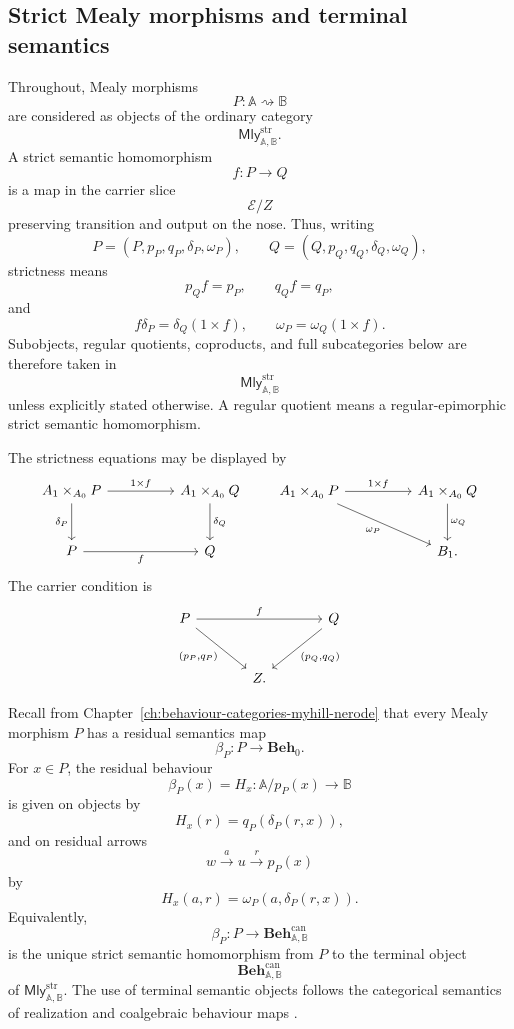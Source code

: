 \subsection{Strict Mealy morphisms and terminal semantics}
\label{subsec:coeq-standing-notation-terminal-semantics}

Throughout, Mealy morphisms
\[
    P:\mathbb A\rightsquigarrow\mathbb B
\]
are considered as objects of the ordinary category
\[
    \mathsf{Mly}^{\mathrm{str}}_{\mathbb A,\mathbb B}.
\]
A strict semantic homomorphism
\[
    f:P\to Q
\]
is a map in the carrier slice
\[
    \mathcal E/Z
\]
preserving transition and output on the nose. Thus, writing
\[
    P=(P,p_P,q_P,\delta_P,\omega_P),
    \qquad
    Q=(Q,p_Q,q_Q,\delta_Q,\omega_Q),
\]
strictness means
\[
    p_Qf=p_P,
    \qquad
    q_Qf=q_P,
\]
and
\[
    f\delta_P
    =
    \delta_Q(1\times f),
    \qquad
    \omega_P
    =
    \omega_Q(1\times f).
\]
Subobjects, regular quotients, coproducts, and full subcategories below are
therefore taken in
\[
    \mathsf{Mly}^{\mathrm{str}}_{\mathbb A,\mathbb B}
\]
unless explicitly stated otherwise. A regular quotient means a
regular-epimorphic strict semantic homomorphism.

The strictness equations may be displayed by
\[
\begin{tikzcd}[column sep=huge, row sep=large]
    A_1\times_{A_0}P
        \arrow[r, "{1\times f}"]
        \arrow[d, "\delta_P"']
    &
    A_1\times_{A_0}Q
        \arrow[d, "\delta_Q"]
    \\
    P
        \arrow[r, "f"']
    &
    Q
\end{tikzcd}
\qquad
\begin{tikzcd}[column sep=huge, row sep=large]
    A_1\times_{A_0}P
        \arrow[r, "{1\times f}"]
        \arrow[dr, "\omega_P"']
    &
    A_1\times_{A_0}Q
        \arrow[d, "\omega_Q"]
    \\
    &
    B_1 .
\end{tikzcd}
\]
The carrier condition is
\[
\begin{tikzcd}[column sep=large, row sep=large]
    P
        \arrow[rr, "f"]
        \arrow[dr, "{(p_P,q_P)}"']
    &&
    Q
        \arrow[dl, "{(p_Q,q_Q)}"]
    \\
    &
    Z .
\end{tikzcd}
\]

Recall from Chapter~\ref{ch:behaviour-categories-myhill-nerode} that every
Mealy morphism \(P\) has a residual semantics map
\[
    \beta_P:P\to\mathbf{Beh}_0.
\]
For \(x\in P\), the residual behaviour
\[
    \beta_P(x)=H_x:\mathbb A/p_P(x)\to\mathbb B
\]
is given on objects by
\[
    H_x(r)=q_P(\delta_P(r,x)),
\]
and on residual arrows
\[
    w\xrightarrow{a}u\xrightarrow{r}p_P(x)
\]
by
\[
    H_x(a,r)=\omega_P(a,\delta_P(r,x)).
\]
Equivalently,
\[
    \beta_P:P\to\mathbf{Beh}^{\mathrm{can}}_{\mathbb A,\mathbb B}
\]
is the unique strict semantic homomorphism from \(P\) to the terminal object
\[
    \mathbf{Beh}^{\mathrm{can}}_{\mathbb A,\mathbb B}
\]
of \(\mathsf{Mly}^{\mathrm{str}}_{\mathbb A,\mathbb B}\). The use of terminal
semantic objects follows the categorical semantics of realization and
coalgebraic behaviour maps
\cite{Goguen1973,Rutten2000,Jacobs2016Coalgebra}.

